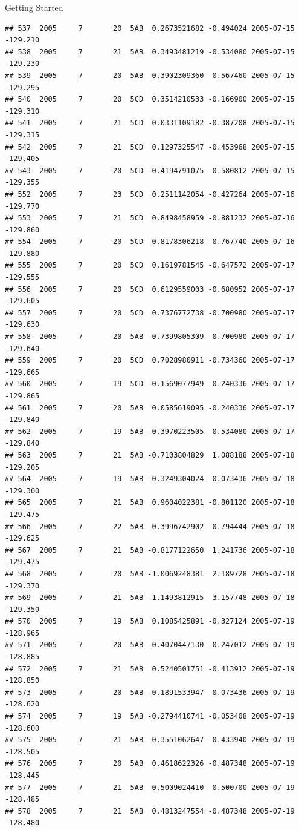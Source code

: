 \documentclass[
  ignorenonframetext,
]{beamer}
\begin{document}
\begin{frame}[fragile]{Getting Started}
\begin{verbatim}
## 537  2005     7       20  5AB  0.2673521682 -0.494024 2005-07-15 -129.210
## 538  2005     7       21  5AB  0.3493481219 -0.534080 2005-07-15 -129.230
## 539  2005     7       20  5AB  0.3902309360 -0.567460 2005-07-15 -129.295
## 540  2005     7       20  5CD  0.3514210533 -0.166900 2005-07-15 -129.310
## 541  2005     7       21  5CD  0.0331109182 -0.387208 2005-07-15 -129.315
## 542  2005     7       21  5CD  0.1297325547 -0.453968 2005-07-15 -129.405
## 543  2005     7       20  5CD -0.4194791075  0.580812 2005-07-15 -129.355
## 552  2005     7       23  5CD  0.2511142054 -0.427264 2005-07-16 -129.770
## 553  2005     7       21  5CD  0.8498458959 -0.881232 2005-07-16 -129.860
## 554  2005     7       20  5CD  0.8178306218 -0.767740 2005-07-16 -129.880
## 555  2005     7       20  5CD  0.1619781545 -0.647572 2005-07-17 -129.555
## 556  2005     7       20  5CD  0.6129559003 -0.680952 2005-07-17 -129.605
## 557  2005     7       20  5CD  0.7376772738 -0.700980 2005-07-17 -129.630
## 558  2005     7       20  5AB  0.7399805309 -0.700980 2005-07-17 -129.640
## 559  2005     7       20  5CD  0.7028980911 -0.734360 2005-07-17 -129.665
## 560  2005     7       19  5CD -0.1569077949  0.240336 2005-07-17 -129.865
## 561  2005     7       20  5AB  0.0585619095 -0.240336 2005-07-17 -129.840
## 562  2005     7       19  5AB -0.3970223505  0.534080 2005-07-17 -129.840
## 563  2005     7       21  5AB -0.7103804829  1.088188 2005-07-18 -129.205
## 564  2005     7       19  5AB -0.3249304024  0.073436 2005-07-18 -129.300
## 565  2005     7       21  5AB  0.9604022381 -0.801120 2005-07-18 -129.475
## 566  2005     7       22  5AB  0.3996742902 -0.794444 2005-07-18 -129.625
## 567  2005     7       21  5AB -0.8177122650  1.241736 2005-07-18 -129.475
## 568  2005     7       20  5AB -1.0069248381  2.189728 2005-07-18 -129.370
## 569  2005     7       21  5AB -1.1493812915  3.157748 2005-07-18 -129.350
## 570  2005     7       19  5AB  0.1085425891 -0.327124 2005-07-19 -128.965
## 571  2005     7       20  5AB  0.4070447130 -0.247012 2005-07-19 -128.885
## 572  2005     7       21  5AB  0.5240501751 -0.413912 2005-07-19 -128.850
## 573  2005     7       20  5AB -0.1891533947 -0.073436 2005-07-19 -128.620
## 574  2005     7       19  5AB -0.2794410741 -0.053408 2005-07-19 -128.600
## 575  2005     7       21  5AB  0.3551062647 -0.433940 2005-07-19 -128.505
## 576  2005     7       20  5AB  0.4618622326 -0.487348 2005-07-19 -128.445
## 577  2005     7       21  5AB  0.5009024410 -0.500700 2005-07-19 -128.485
## 578  2005     7       21  5AB  0.4813247554 -0.487348 2005-07-19 -128.480

\end{verbatim}
\end{frame}
\end{document}
